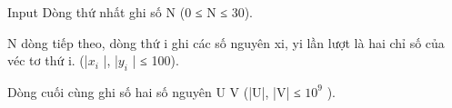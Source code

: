 Input
Dòng thứ nhất ghi số N (0 ≤ N ≤ 30).  

   N dòng tiếp theo, dòng thứ i ghi các số nguyên xi, yi lần lượt là hai chỉ số của véc tơ thứ i. (|$x_{i}$   |, |$y_{i}$   | ≤ 100).  

   Dòng cuối cùng ghi số hai số nguyên U V (|U|, |V| ≤ $10^{9}$   ).